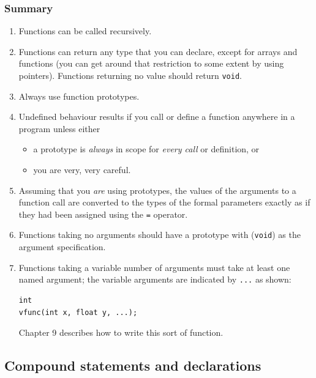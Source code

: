   \subsubsection{Summary}
    \begin{enumerate}
     \item Functions can be called recursively.
     \item Functions can return any type that you can declare, except for
      arrays and functions (you can get around that restriction to some
      extent by using pointers). Functions returning no value should return
      \texttt{void}.
     \item Always use function prototypes.
     \item Undefined behaviour results if you call or define a function
      anywhere in a program unless either
      \begin{itemize}
       \item a prototype is \textit{always} in scope for \textit{every call}
        or definition, or
       \item you are very, very careful.
      \end{itemize}
     
     \item Assuming that you \textit{are} using prototypes, the values of the
      arguments to a function call are converted to the types of the formal
      parameters exactly as if they had been assigned using
      the \texttt{=} operator.
     \item Functions taking no arguments should have a prototype with
      (\texttt{void}) as the argument specification.
     \item 
      Functions taking a variable number of arguments must take at least
       one named argument; the variable arguments are indicated
       by \texttt{...} as shown:

\begin{Verbatim}
int
vfunc(int x, float y, ...);
\end{Verbatim}

      Chapter 9 describes how to write this sort of
       function.

     
    \end{enumerate}
  

 

  \subsection{Compound statements and declarations}
   

